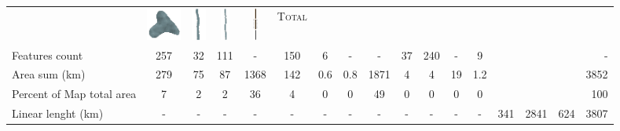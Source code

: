 \documentclass[portrait, A0]{sciposter}
\begin{document}
\begin{minipage}[b]{75cm}
\begin{multicols}{3}
\begin{tabular}{l|cccccccc|c|ccccc|c|r}
&\includegraphics[height=30pt]{gfx/lac_couleur.png}
&\includegraphics[height=30pt]{gfx/riviere_medium_couleur.png}
&\includegraphics[height=30pt]{gfx/riviere_small_couleur.png}
&\includegraphics[height=30pt]{gfx/routes_couleur.png}
&\textsc{Total}\\
Features count&257&32&111&-&150&6&-&-&37&240&-&9&&&&-\\
Area sum (km\up{2})&\num{279}&\num{75}&\num{87}&\num{1368}&\num{142}&\num{0,6}&\num{0,8}&\num{1871}&\num{4}&\num{4}&\num{19}&\num{1,2}&&&&\num{3852}\\
Percent of Map total area&7&2&2&36&4&0&0&49&0&0&0&0&&&&100\\
Linear lenght (km)&-&-&-&-&-&-&-&-&-&-&-&-&\num{341}&\num{2841}&\num{624}&\num{3807}
\end{tabular}


\footnotesize


\end{multicols}
\end{minipage}
\end{document}

